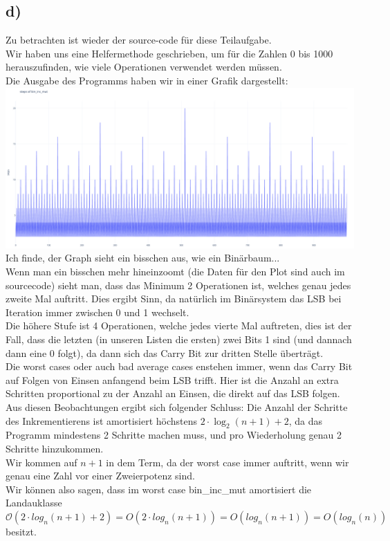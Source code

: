 \documentclass[12pt, a4paper]{article}
\begin{document}
\subsection*{d)}
Zu betrachten ist wieder der source-code für diese Teilaufgabe. \\
Wir haben uns eine Helfermethode geschrieben, um für die Zahlen 0 bis 1000 herauszufinden, wie viele Operationen verwendet werden müssen. \\
Die Ausgabe des Programms haben wir in einer Grafik dargestellt:\\
\includegraphics[width=\textwidth]{DiagramFor7.2.4.png}
Ich finde, der Graph sieht ein bisschen aus, wie ein Binärbaum... \\
Wenn man ein bisschen mehr hineinzoomt (die Daten für den Plot sind auch im sourcecode) sieht man, dass das Minimum 2 Operationen ist, welches genau jedes zweite Mal auftritt. Dies ergibt Sinn, da natürlich im Binärsystem das LSB bei Iteration immer zwischen 0 und 1 wechselt. \\
Die höhere Stufe ist 4 Operationen, welche jedes vierte Mal auftreten, dies ist der Fall, dass die letzten (in unseren Listen die ersten) zwei Bits 1 sind (und dannach dann eine 0 folgt), da dann sich das Carry Bit zur dritten Stelle überträgt. \\
Die worst cases oder auch bad average cases enstehen immer, wenn das Carry Bit auf Folgen von Einsen anfangend beim LSB trifft. Hier ist die Anzahl an extra Schritten proportional zu der Anzahl an Einsen, die direkt auf das LSB folgen. \pagebreak \\
Aus diesen Beobachtungen ergibt sich folgender Schluss: Die Anzahl der Schritte des Inkrementierens ist amortisiert höchstens \(2 \cdot \log_2 (n + 1) + 2\), da das Programm mindestens 2 Schritte machen muss, und pro Wiederholung genau 2 Schritte hinzukommen. \\
Wir kommen auf \(n + 1\) in dem Term, da der worst case immer auftritt, wenn wir genau eine Zahl vor einer Zweierpotenz sind. \\
Wir können also sagen, dass im worst case bin\_inc\_mut amortisiert die Landauklasse \(\mathcal O(2\cdot log_n(n+1) + 2) = O(2\cdot log_n(n+1)) = O(log_n(n+1)) = O(log_n(n))\) besitzt.
\end{document}
